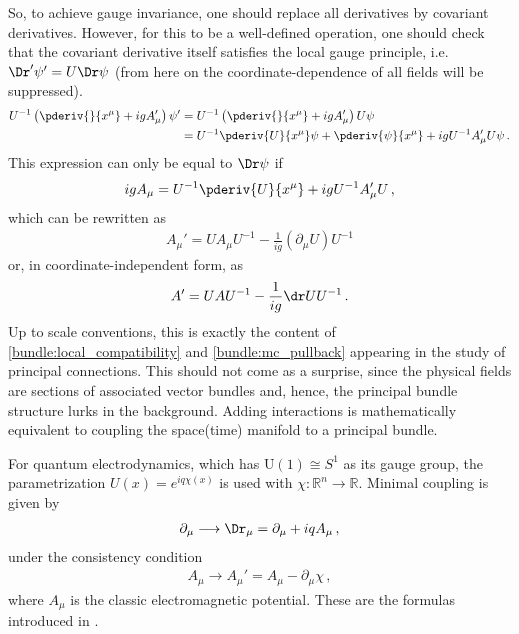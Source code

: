     So, to achieve gauge invariance, one should replace all derivatives by covariant derivatives. However, for this to be a well-defined operation, one should check that the covariant derivative itself satisfies the local gauge principle, i.e.~$\Dr'\psi'=U\Dr\psi$ (from here on the coordinate-dependence of all fields will be suppressed).
    \begin{align}
        U^{-1}\left(\pderiv{}{x^\mu} + igA_\mu'\right)\psi' &= U^{-1}\left(\pderiv{}{x^\mu} + igA_\mu'\right)U\psi\nonumber\\
        &= U^{-1}\pderiv{U}{x^\mu}\psi + \pderiv{\psi}{x^\mu} + igU^{-1}A_\mu'U\psi\,.
    \end{align}
    This expression can only be equal to $\Dr\psi$ if
    \begin{gather}
        igA_\mu = U^{-1}\pderiv{U}{x^\mu} + igU^{-1}A_\mu'U\,,
    \end{gather}
    which can be rewritten as
    \begin{gather}
        \label{gauge:gauge_transformed_connection}
        A_\mu' = UA_\mu U^{-1} - \frac{1}{ig}(\partial_\mu U)U^{-1}
    \end{gather}
    or, in coordinate-independent form, as
    \begin{gather}
        A' = UAU^{-1} - \frac{1}{ig}\dr UU^{-1}\,.
    \end{gather}
    Up to scale conventions, this is exactly the content of \cref{bundle:local_compatibility} and \cref{bundle:mc_pullback} appearing in the study of principal connections. This should not come as a surprise, since the physical fields are sections of associated vector bundles and, hence, the principal bundle structure lurks in the background. Adding interactions is mathematically equivalent to coupling the space(time) manifold to a principal bundle.

    \begin{example}[QED]
        For quantum electrodynamics, which has $\mathrm{U}(1)\cong S^1$ as its gauge group, the parametrization $U(x)=e^{iq\chi(x)}$ is used with $\chi:\mathbb{R}^n\rightarrow\mathbb{R}$. Minimal coupling is given by
        \begin{gather}
            \partial_\mu\longrightarrow\Dr_\mu = \partial_\mu + iqA_\mu\,,
        \end{gather}
        under the consistency condition
        \begin{gather}
            A_\mu\longrightarrow A_\mu' = A_\mu - \partial_\mu\chi\,,
        \end{gather}
        where $A_\mu$ is the classic electromagnetic potential. These are the formulas introduced in .
    \end{example}

